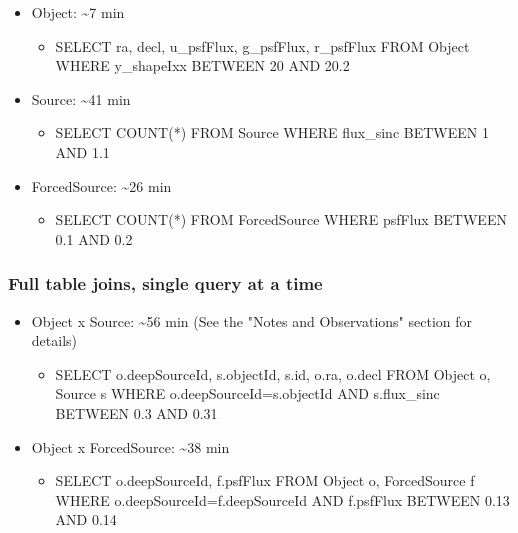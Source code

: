 \begin{itemize}
\item
  Object: \textasciitilde{}7 min

  \begin{itemize}
  \item
    SELECT ra, decl, u\_psfFlux, g\_psfFlux, r\_psfFlux FROM Object
    WHERE y\_shapeIxx BETWEEN 20 AND 20.2
  \end{itemize}
\item
  Source: \textasciitilde{}41 min

  \begin{itemize}
  \item
    SELECT COUNT(*) FROM Source WHERE flux\_sinc BETWEEN 1 AND 1.1
  \end{itemize}
\item
  ForcedSource: \textasciitilde{}26 min

  \begin{itemize}
  \item
    SELECT COUNT(*) FROM ForcedSource WHERE psfFlux BETWEEN 0.1 AND 0.2
  \end{itemize}
\end{itemize}

\subsubsection{\texorpdfstring{\textbf{Full table joins, single query at
a
time}}{Full table joins, single query at a time}}\label{full-table-joins-single-query-at-a-time}

\begin{itemize}
\item
  Object x Source: \textasciitilde{}56 min (See the "Notes and
  Observations" section for details)

  \begin{itemize}
  \item
    SELECT o.deepSourceId, s.objectId, s.id, o.ra, o.decl FROM Object o,
    Source s WHERE o.deepSourceId=s.objectId AND s.flux\_sinc BETWEEN
    0.3 AND 0.31
  \end{itemize}
\item
  Object x ForcedSource: \textasciitilde{}38 min

  \begin{itemize}
  \item
    SELECT o.deepSourceId, f.psfFlux FROM Object o, ForcedSource f WHERE
    o.deepSourceId=f.deepSourceId AND f.psfFlux BETWEEN 0.13 AND 0.14
  \end{itemize}
\end{itemize}

